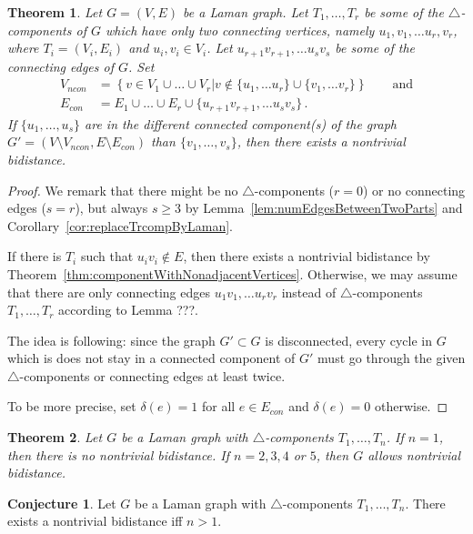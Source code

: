 \documentclass[a4paper, 11pt]{article}
\newcommand{\trcomps}{$\triangle$-components}
\newtheorem{thm}{Theorem}[section]
\theoremstyle{definition}
\newtheorem{conj}{Conjecture}
\begin{document}
\begin{thm}
Let $G=(V,E)$ be a Laman graph. Let  $T_1, \dots, T_r$ be some of the \trcomps{} of $G$ which have only two connecting vertices, namely $u_1, v_1, \dots u_r,v_r$, where  $T_i=(V_i,E_i)$ and $u_i, v_i\in V_i$. Let  $u_{r+1}v_{r+1}, \dots u_s v_s$ be some of the connecting edges of $G$. Set 
\begin{align*}
V_{ncon}&=\left\{v\in V_1 \cup \dots \cup V_r | v\notin \{u_1, \dots u_r\}\cup \{v_1, \dots v_r\} \right\} \qquad \text{and} \\
E_{con}&=E_1 \cup \dots \cup E_r \cup \{u_{r+1}v_{r+1}, \dots u_s v_s\}\,.
\end{align*}
If $\{u_1, \dots, u_s\}$ are in the different connected component(s) of the graph $G'=(V\setminus V_{ncon},E\setminus E_{con})$ than $\{v_1, \dots, v_s\}$, then there exists a nontrivial bidistance.
\end{thm}
\begin{proof}
We remark that there might be no \trcomps{} ($r=0$) or no connecting edges ($s=r$), but always $s\geq 3$ by Lemma~\ref{lem:numEdgesBetweenTwoParts} and Corollary~\ref{cor:replaceTrcompByLaman}.

If there is $T_i$ such that $u_i v_i \notin E$, then there exists a nontrivial bidistance by Theorem~\ref{thm:componentWithNonadjacentVertices}.
Otherwise, we may assume that there are only connecting edges  $u_1 v_1, \dots u_r v_r$ instead of \trcomps{} $T_1, \dots, T_r$ according to Lemma ???.

The idea is following: since the graph $G'\subset G$ is disconnected, every cycle in $G$ which is does not stay in a connected component of $G'$ must go through the given \trcomps{} or connecting edges at least twice.


To be more precise, set $\delta(e)=1$ for all $e \in E_{con}$ and $\delta(e)=0$ otherwise. 
\end{proof}

\begin{thm}
Let $G$ be a Laman graph with \trcomps{} $T_1,\dots, T_n$. If $n=1$, then there is no nontrivial bidistance. If $n=2,3,4$ or $5$, then $G$ allows nontrivial bidistance.
\end{thm}

\begin{conj}
Let $G$ be a Laman graph with \trcomps{} $T_1,\dots, T_n$. There exists a nontrivial bidistance iff $n>1$.
\end{conj}
\end{document}

